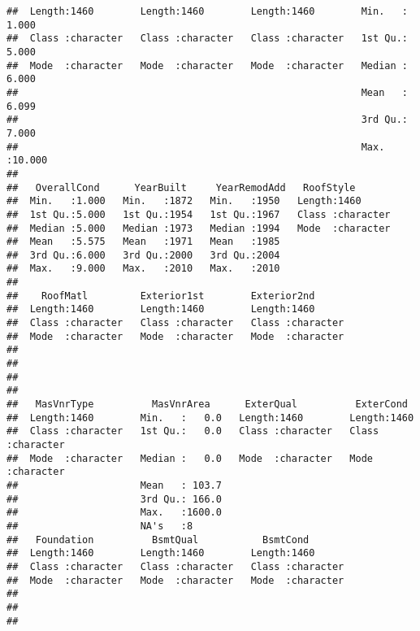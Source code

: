 \documentclass[]{article}
\begin{document}
\begin{verbatim}
##  Length:1460        Length:1460        Length:1460        Min.   : 1.000  
##  Class :character   Class :character   Class :character   1st Qu.: 5.000  
##  Mode  :character   Mode  :character   Mode  :character   Median : 6.000  
##                                                           Mean   : 6.099  
##                                                           3rd Qu.: 7.000  
##                                                           Max.   :10.000  
##                                                                           
##   OverallCond      YearBuilt     YearRemodAdd   RoofStyle        
##  Min.   :1.000   Min.   :1872   Min.   :1950   Length:1460       
##  1st Qu.:5.000   1st Qu.:1954   1st Qu.:1967   Class :character  
##  Median :5.000   Median :1973   Median :1994   Mode  :character  
##  Mean   :5.575   Mean   :1971   Mean   :1985                     
##  3rd Qu.:6.000   3rd Qu.:2000   3rd Qu.:2004                     
##  Max.   :9.000   Max.   :2010   Max.   :2010                     
##                                                                  
##    RoofMatl         Exterior1st        Exterior2nd       
##  Length:1460        Length:1460        Length:1460       
##  Class :character   Class :character   Class :character  
##  Mode  :character   Mode  :character   Mode  :character  
##                                                          
##                                                          
##                                                          
##                                                          
##   MasVnrType          MasVnrArea      ExterQual          ExterCond        
##  Length:1460        Min.   :   0.0   Length:1460        Length:1460       
##  Class :character   1st Qu.:   0.0   Class :character   Class :character  
##  Mode  :character   Median :   0.0   Mode  :character   Mode  :character  
##                     Mean   : 103.7                                        
##                     3rd Qu.: 166.0                                        
##                     Max.   :1600.0                                        
##                     NA's   :8                                             
##   Foundation          BsmtQual           BsmtCond        
##  Length:1460        Length:1460        Length:1460       
##  Class :character   Class :character   Class :character  
##  Mode  :character   Mode  :character   Mode  :character  
##                                                          
##                                                          
##                                                          

\end{verbatim}
\end{document}
